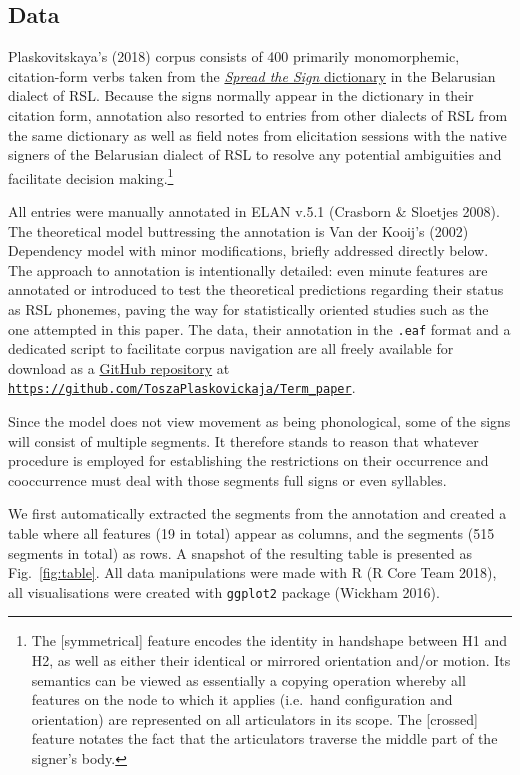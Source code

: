 \hypertarget{data}{%
\subsection{Data}\label{data}}

Plaskovitskaya's (2018) corpus consists of 400 primarily monomorphemic,
citation-form verbs taken from the
\href{http://www.spreadthesign.com/be/}{\emph{Spread the Sign}
dictionary} in the Belarusian dialect of RSL. Because the signs normally
appear in the dictionary in their citation form, annotation also
resorted to entries from other dialects of RSL from the same dictionary
as well as field notes from elicitation sessions with the native signers
of the Belarusian dialect of RSL to resolve any potential ambiguities
and facilitate decision making.\footnote{The {[}symmetrical{]} feature
  encodes the identity in handshape between H1 and H2, as well as either
  their identical or mirrored orientation and/or motion. Its semantics
  can be viewed as essentially a copying operation whereby all features
  on the node to which it applies (i.e.~hand configuration and
  orientation) are represented on all articulators in its scope. The
  {[}crossed{]} feature notates the fact that the articulators traverse
  the middle part of the signer's body.}

All entries were manually annotated in ELAN v.5.1 (Crasborn \& Sloetjes
2008). The theoretical model buttressing the annotation is Van der
Kooij's (2002) Dependency model with minor modifications, briefly
addressed directly below. The approach to annotation is intentionally
detailed: even minute features are annotated or introduced to test the
theoretical predictions regarding their status as RSL phonemes, paving
the way for statistically oriented studies such as the one attempted in
this paper. The data, their annotation in the \texttt{.eaf} format and a
dedicated script to facilitate corpus navigation are all freely
available for download as a
\href{https://github.com/ToszaPlaskovickaja/Term_paper}{GitHub
repository} at
\href{https://github.com/ToszaPlaskovickaja/Term_paper}{\texttt{https://github.com/ToszaPlaskovickaja/Term\_paper}}.

Since the model does not view movement as being phonological, some of
the signs will consist of multiple segments. It therefore stands to
reason that whatever procedure is employed for establishing the
restrictions on their occurrence and cooccurrence must deal with those
segments full signs or even syllables.

We first automatically extracted the segments from the annotation and
created a table where all features (19 in total) appear as columns, and
the segments (515 segments in total) as rows. A snapshot of the
resulting table is presented as Fig.~\ref{fig:table}. All data
manipulations were made with R (R Core Team 2018), all visualisations
were created with \texttt{ggplot2} package (Wickham 2016).

